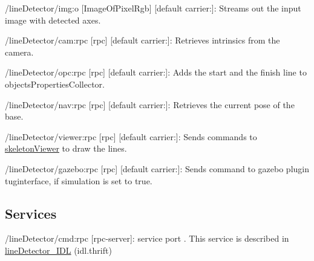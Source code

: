 \begin{DoxyItemize}
\item /line\+Detector/img\+:o \mbox{[}Image\+Of\+Pixel\+Rgb\mbox{]} \mbox{[}default carrier\+:\mbox{]}\+: Streams out the input image with detected axes.
\item /line\+Detector/cam\+:rpc \mbox{[}rpc\mbox{]} \mbox{[}default carrier\+:\mbox{]}\+: Retrieves intrinsics from the camera.
\item /line\+Detector/opc\+:rpc \mbox{[}rpc\mbox{]} \mbox{[}default carrier\+:\mbox{]}\+: Adds the start and the finish line to objects\+Properties\+Collector.
\item /line\+Detector/nav\+:rpc \mbox{[}rpc\mbox{]} \mbox{[}default carrier\+:\mbox{]}\+: Retrieves the current pose of the base.
\item /line\+Detector/viewer\+:rpc \mbox{[}rpc\mbox{]} \mbox{[}default carrier\+:\mbox{]}\+: Sends commands to \hyperlink{group__skeletonViewer}{skeleton\+Viewer} to draw the lines.
\item /line\+Detector/gazebo\+:rpc \mbox{[}rpc\mbox{]} \mbox{[}default carrier\+:\mbox{]}\+: Sends command to gazebo plugin tuginterface, if simulation is set to true.
\end{DoxyItemize}\hypertarget{group__skeletonViewer_services_sec}{}\subsection{Services}\label{group__skeletonViewer_services_sec}

\begin{DoxyItemize}
\item /line\+Detector/cmd\+:rpc \mbox{[}rpc-\/server\mbox{]}\+: service port . This service is described in \hyperlink{classlineDetector__IDL}{line\+Detector\+\_\+\+I\+DL} (idl.\+thrift) 
\end{DoxyItemize}